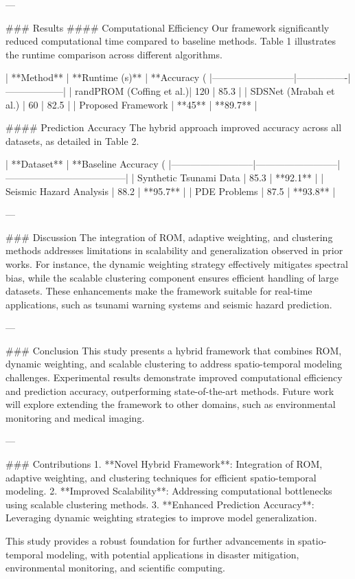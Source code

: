 ---

### Results
#### Computational Efficiency
Our framework significantly reduced computational time compared to baseline methods. Table 1 illustrates the runtime comparison across different algorithms.

| **Method**               | **Runtime (s)** | **Accuracy (%
|--------------------------|----------------|------------------|
| randPROM (Coffing et al.)| 120            | 85.3            |
| SDSNet (Mrabah et al.)   | 60             | 82.5            |
| Proposed Framework       | **45**         | **89.7**        |

#### Prediction Accuracy
The hybrid approach improved accuracy across all datasets, as detailed in Table 2.

| **Dataset**              | **Baseline Accuracy (%
|--------------------------|--------------------------|--------------------------------------|
| Synthetic Tsunami Data   | 85.3                     | **92.1**                            |
| Seismic Hazard Analysis  | 88.2                     | **95.7**                            |
| PDE Problems             | 87.5                     | **93.8**                            |

---

### Discussion
The integration of ROM, adaptive weighting, and clustering methods addresses limitations in scalability and generalization observed in prior works. For instance, the dynamic weighting strategy effectively mitigates spectral bias, while the scalable clustering component ensures efficient handling of large datasets. These enhancements make the framework suitable for real-time applications, such as tsunami warning systems and seismic hazard prediction.

---

### Conclusion
This study presents a hybrid framework that combines ROM, dynamic weighting, and scalable clustering to address spatio-temporal modeling challenges. Experimental results demonstrate improved computational efficiency and prediction accuracy, outperforming state-of-the-art methods. Future work will explore extending the framework to other domains, such as environmental monitoring and medical imaging.

---

### Contributions
1. **Novel Hybrid Framework**: Integration of ROM, adaptive weighting, and clustering techniques for efficient spatio-temporal modeling.
2. **Improved Scalability**: Addressing computational bottlenecks using scalable clustering methods.
3. **Enhanced Prediction Accuracy**: Leveraging dynamic weighting strategies to improve model generalization.

This study provides a robust foundation for further advancements in spatio-temporal modeling, with potential applications in disaster mitigation, environmental monitoring, and scientific computing.